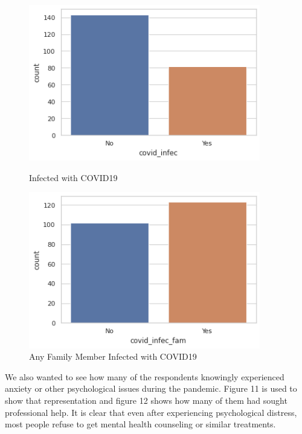 \documentclass[12pt, english]{article}
\begin{document}
\begin{figure}[H]
    \centering
    \begin{minipage}{0.45\textwidth}
        \centering
        \includegraphics[width=0.9\textwidth]{images/covid_infec.png} %
        \caption{Infected with COVID19}
    \end{minipage}\hfill
    \begin{minipage}{0.45\textwidth}
        \centering
        \includegraphics[width=0.9\textwidth]{images/covid_infec_fam.png} %
        \caption{Any Family Member Infected with COVID19}
    \end{minipage}
\end{figure}

We also wanted to see how many of the respondents knowingly experienced anxiety or other psychological issues during the pandemic. Figure 11 is used to show that representation and figure 12 shows how many of them had sought professional help. It is clear that even after experiencing psychological distress, most people refuse to get mental health counseling or similar treatments. 
\end{document}

